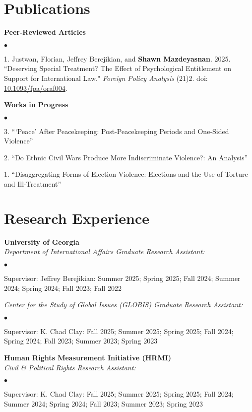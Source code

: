 \documentclass[letterpaper,12pt]{article}
\newenvironment{list2}{
  \begin{list}{$\bullet$}{%
      \setlength{\itemsep}{0in}
      \setlength{\parsep}{0in} 
      \setlength{\parskip}{0in}
      \setlength{\topsep}{0in} 
      \setlength{\partopsep}{0in}
      \setlength{\leftmargin}{1in}
      \setlength{\labelsep}{1em}
      \setlength{\labelwidth}{1em}
      \setlength{\itemindent}{-2em}
      \setlength{\listparindent}{2em}}}{\end{list}}
\begin{document}
\section{Publications}
\textbf{Peer-Reviewed Articles}
\par
\begin{list2}
    \item[1.] Justwan, Florian, Jeffrey Berejikian, and \textbf{Shawn Mazdeyasnan}. 2025. ``Deserving Special \mbox{Treatment?} The Effect of Psychological Entitlement on Support for International Law." \textit{\mbox{Foreign} Policy Analysis} (21)2. doi: \href{https://doi.org/10.1093/fpa/oraf004}{10.1093/fpa/oraf004}.
\end{list2}
\par
\textbf{Works in Progress}
\par
\begin{list2}
    \item[3.] ```Peace' After Peacekeeping: Post-Peacekeeping Periods and One-Sided Violence”
    \item[2.] ``Do Ethnic Civil Wars Produce More Indiscriminate Violence?: An Analysis”
    \item[1.] ``Disaggregating Forms of Election Violence: Elections and the Use of Torture and Ill-Treatment” 
\end{list2}

\section{Research Experience}
\textbf{University of Georgia}\\
\textit{Department of International Affairs Graduate Research Assistant:}
\begin{list2}
    \item Supervisor: Jeffrey Berejikian: Summer 2025; Spring 2025; Fall 2024; Summer 2024; Spring 2024; Fall 2023; Fall 2022
\end{list2}
\par
\textit{Center for the Study of Global Issues (GLOBIS) Graduate Research Assistant:}
\begin{list2}
    \item Supervisor: K. Chad Clay: Fall 2025; Summer 2025; Spring 2025; Fall 2024; Spring 2024; Fall 2023; Summer 2023; Spring 2023
\end{list2}
\par
\textbf{Human Rights Measurement Initiative (HRMI)}\\
\textit{Civil \& Political Rights Research Assistant:}
\begin{list2}
    \item Supervisor: K. Chad Clay: Fall 2025; Summer 2025; Spring 2025; Fall 2024; Summer 2024; Spring 2024; Fall 2023; Summer 2023; Spring 2023
\end{list2}
\end{document}
